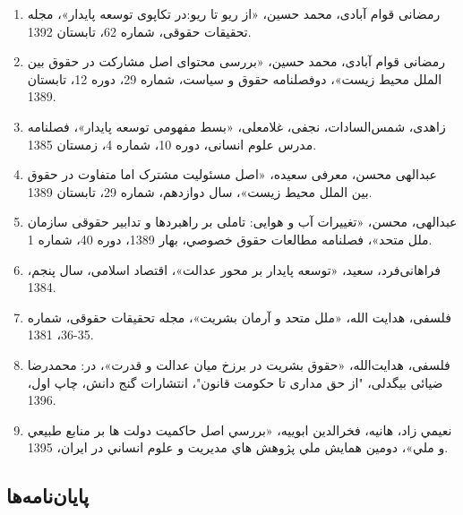 \begin{enumerate}
\item 	رمضانی قوام آبادی، محمد حسین، «از ریو تا ریو:در تکاپوی توسعه پایدار»، مجله تحقیقات حقوقی، شماره 62، تابستان 1392.
\item 	رمضانی قوام آبادی، محمد حسین، «بررسی محتوای اصل مشارکت در حقوق بین الملل محیط زیست»، دوفصلنامه حقوق و سیاست، شماره 29، دوره 12، تابستان 1389.
\item 	زاهدی، شمس‌السادات، نجفی، غلامعلی، «بسط مفهومی توسعه پایدار»، فصلنامه مدرس علوم انسانی، دوره 10، شماره 4، زمستان 1385.
\item 	عبدالهی محسن، معرفی سعیده، «اصل مسئولیت مشترک اما متفاوت در حقوق بین الملل محیط زیست»، سال دوازدهم، شماره 29، تابستان 1389.
\item 	عبدالهی، محسن، «تغییرات آب و هوایی: تاملی بر راهبردها و تدابیر حقوقی سازمان ملل متحد»، فصلنامه مطالعات حقوق خصوصي، بهار 1389، دوره 40، شماره 1.
\item 	فراهانی‌فرد، سعید، «توسعه پایدار بر محور عدالت»، اقتصاد اسلامی، سال پنجم، 1384.
\item 	فلسفی، هدایت الله، «ملل متحد و آرمان بشریت»، مجله تحقیقات حقوقی، شماره 35-36، 1381.
\item 	فلسفی، هدایت‌الله، «حقوق بشریت در برزخ میان عدالت و قدرت»، در: محمدرضا ضیائی بیگدلی، "از حق مداری تا حکومت قانون"، انتشارات گنج دانش، چاپ اول، 1396.
\item 	نعيمي زاد، هانيه،  فخرالدين ابوييه، «بررسي اصل حاكميت دولت ها بر منابع طبيعي و ملي»، دومين همايش ملي پژوهش هاي مديريت و علوم انساني در ايران، 1395.
	
				\end{enumerate}


\subsection*{پایان‌نامه‌ها}

